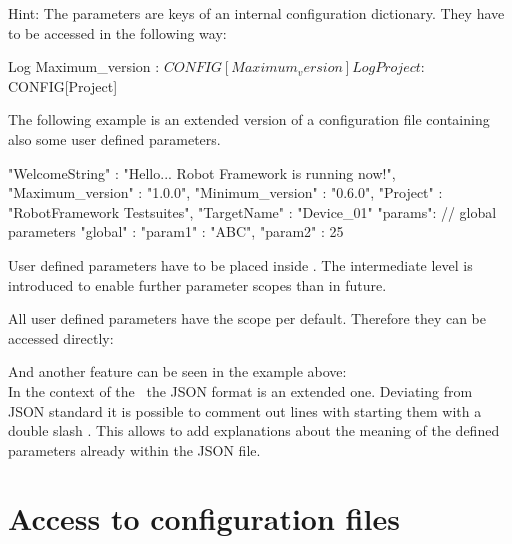 Hint: The parameters are keys of an internal configuration dictionary. They have to be accessed in the following way:

\begin{robotcode}
Log    Maximum_version : ${CONFIG}[Maximum_version]
Log    Project : ${CONFIG}[Project]
\end{robotcode}

\vspace{1ex}

The following example is an extended version of a configuration file containing also some user defined parameters.

\begin{pythoncode}
{
  "WelcomeString"   : "Hello... Robot Framework is running now!",
  "Maximum_version" : "1.0.0",
  "Minimum_version" : "0.6.0",
  "Project"         : "RobotFramework Testsuites",
  "TargetName"      : "Device_01"
  "params": {
              // global parameters
              "global" : {
                           "param1" : "ABC",
                           "param2" : 25
                         }
            }
}
\end{pythoncode}

User defined parameters have to be placed inside . The intermediate level  is introduced to enable further
parameter scopes than  in future.

All user defined parameters have the scope  per default. Therefore they can be accessed directly:


And another feature can be seen in the example above:\\
In the context of the \pkg\ the JSON format is an extended one.
Deviating from JSON standard it is possible to comment out lines with starting them with a double slash \pcode{//}.
This allows to add explanations about the meaning of the defined parameters already within the JSON file.

\newpage

\section{Access to configuration files}

